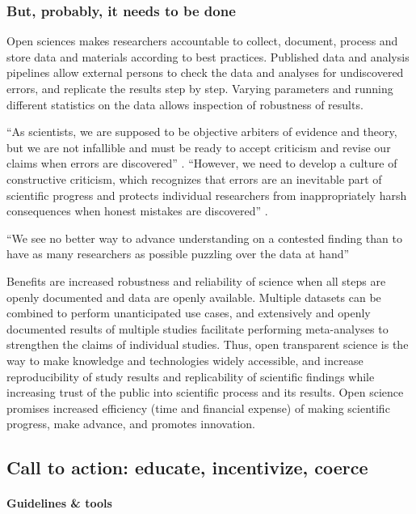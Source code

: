 \subsubsection{But, probably, it needs to be done}

Open sciences makes researchers accountable to collect, document, process and
store data and materials according to best practices.
%
Published data and analysis pipelines allow external persons to check the data
and analyses for undiscovered errors, and replicate the results step by step.
%
Varying parameters and running different statistics on the data allows
inspection of robustness of results.

%
``As scientists, we are supposed to be objective arbiters of evidence and
theory, but we are not infallible and must be ready to accept criticism and
revise our claims when errors are discovered'' \citep{nichols2017best}.
%
``However, we need to develop a culture of constructive criticism, which
recognizes that errors are an inevitable part of scientific progress and
protects individual researchers from inappropriately harsh consequences when
honest mistakes are discovered'' \citep{nichols2017best}.

%
``We see no better way to advance understanding on a contested finding than to
have as many researchers as possible puzzling over the data at hand''
\citep{nichols2017best}

%
Benefits are increased robustness and reliability of science when all steps are
openly documented and data are openly available.
%
Multiple datasets can be combined to perform unanticipated use cases, and
extensively and openly documented results of multiple studies facilitate
performing meta-analyses to strengthen the claims of individual studies.
%
Thus, open transparent science is the way to make knowledge and technologies
widely accessible, and increase reproducibility of study results and
replicability of scientific findings while increasing trust of the public into
scientific process and its results.
%
Open science promises increased efficiency (time and financial expense) of
making scientific progress, make advance, and promotes innovation.



\subsection{Call to action: educate, incentivize, coerce}

\paragraph{Guidelines \& tools}

